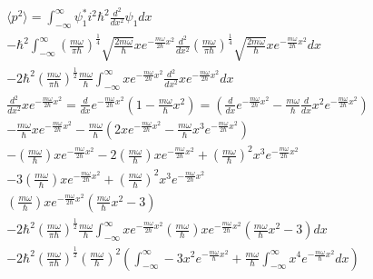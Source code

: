 \documentclass[11pt, A4paper,norsk]{article}
\begin{document}
				\begin{gather*}
\langle p^2 \rangle = \int_{- \infty}^{\infty} \psi_1^{*} i^2 \hbar^2 \frac{d^2}{dx^2} \psi_1 dx \\
- \hbar^2 \int_{- \infty}^{\infty} \left( \frac{m \omega}{\pi \hbar} \right)^{\frac{1}{4}} \sqrt{\frac{2 m \omega}{\hbar}} x e^{- \frac{m \omega}{2 \hbar} x^2} \frac{d^2}{dx^2} \left( \frac{m \omega}{\pi \hbar} \right)^{\frac{1}{4}} \sqrt{\frac{2 m \omega}{\hbar}} x e^{- \frac{m \omega}{2 \hbar} x^2} dx \\
- 2 \hbar^2 \left( \frac{m \omega}{\pi \hbar} \right)^{\frac{1}{2}} \frac{m \omega}{\hbar} \int_{- \infty}^{\infty} x e^{- \frac{m \omega}{2 \hbar} x^2} \frac{d^2}{dx^2} x e^{- \frac{m \omega}{2 \hbar} x^2} dx \\
\frac{d^2}{dx^2} x e^{- \frac{m \omega}{2 \hbar} x^2} = \frac{d}{dx}  e^{- \frac{m \omega}{2 \hbar} x^2} \left( 1 - \frac{m \omega}{\hbar} x^2 \right) = \left( \frac{d}{dx} e^{- \frac{m \omega}{2 \hbar} x^2} - \frac{m \omega}{\hbar} \frac{d}{dx} x^2 e^{- \frac{m \omega}{2 \hbar} x^2} \right) \\
- \frac{m \omega}{\hbar} x e^{- \frac{m \omega}{2 \hbar} x^2} - \frac{m \omega}{\hbar} \left( 2x e^{- \frac{m \omega}{2 \hbar} x^2} - \frac{m \omega}{\hbar} x^3 e^{- \frac{m \omega}{2 \hbar} x^2} \right) \\
- \left( \frac{m \omega}{\hbar} \right) x e^{- \frac{m \omega}{2 \hbar} x^2} - 2 \left( \frac{m \omega}{\hbar} \right) x e^{- \frac{m \omega}{2 \hbar} x^2} + \left( \frac{m \omega}{\hbar} \right)^{2} x^3 e^{- \frac{m \omega}{2 \hbar} x^2} \\
- 3 \left( \frac{m \omega}{\hbar} \right) x e^{- \frac{m \omega}{2 \hbar} x^2} + \left( \frac{m \omega}{\hbar} \right)^{2} x^3 e^{- \frac{m \omega}{2 \hbar} x^2} \\
\left( \frac{m \omega}{\hbar} \right) x e^{- \frac{m \omega}{2 \hbar} x^2} \left( \frac{m \omega}{\hbar} x^2 - 3 \right) \\
- 2 \hbar^2 \left( \frac{m \omega}{\pi \hbar} \right)^{\frac{1}{2}} \frac{m \omega}{\hbar} \int_{- \infty}^{\infty} x e^{- \frac{m \omega}{2 \hbar} x^2} \left( \frac{m \omega}{\hbar} \right) x e^{- \frac{m \omega}{2 \hbar} x^2} \left( \frac{m \omega}{\hbar} x^2 - 3 \right) dx \\
- 2 \hbar^2 \left( \frac{m \omega}{\pi \hbar} \right)^{\frac{1}{2}} \left( \frac{m \omega}{\hbar} \right)^{2} \left( \int_{- \infty}^{\infty} - 3 x^2 e^{- \frac{m \omega}{\hbar} x^2} + \frac{m \omega}{\hbar} \int_{- \infty}^{\infty} x^4 e^{- \frac{m \omega}{\hbar} x^2} dx \right) \\

\end{gather*}
\end{document}
